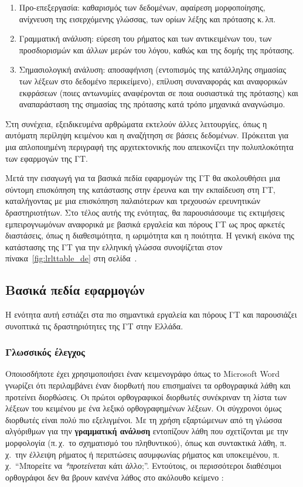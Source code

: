 \documentclass[]{../../metanetpaper}
\begin{document}
\begin{multicols}{2}
\begin{enumerate}
\item Προ-επεξεργασία: καθαρισμός των δεδομένων, αφαίρεση μορφοποίησης, ανίχνευση της εισερχόμενης γλώσσας, των ορίων λέξης και πρότασης κ.\,λπ.
\item Γραμματική ανάλυση: εύρεση του ρήματος και των αντικειμένων του, των προσδιορισμών και άλλων μερών του λόγου,  καθώς και της δομής της πρότασης.
\item Σημασιολογική ανάλυση: αποσαφήνιση (εντοπισμός της κατάλληλης σημασίας των λέξεων στο δεδομένο περικείμενο), επίλυση συναναφοράς και αναφορικών εκφράσεων (ποιες αντωνυμίες αναφέρονται σε ποια ουσιαστικά της πρότασης) και αναπαράσταση της σημασίας της πρότασης κατά τρόπο μηχανικά αναγνώσιμο.
\end{enumerate}

Στη συνέχεια, εξειδικευμένα αρθρώματα εκτελούν άλλες λειτουργίες, όπως η αυτόματη περίληψη κειμένου και η αναζήτηση σε βάσεις δεδομένων. Πρόκειται για μια απλοποιημένη περιγραφή της αρχιτεκτονικής που απεικονίζει την πολυπλοκότητα των εφαρμογών της ΓΤ. 

Μετά την εισαγωγή για τα βασικά πεδία εφαρμογών της ΓΤ θα ακολουθήσει μια σύντομη επισκόπηση της κατάστασης στην έρευνα και την εκπαίδευση στη ΓΤ, καταλήγοντας με μια επισκόπηση παλαιότερων και τρεχουσών ερευνητικών δραστηριοτήτων. Στο τέλος αυτής της ενότητας, θα παρουσιάσουμε τις εκτιμήσεις εμπειρογνωμόνων αναφορικά με βασικά εργαλεία και πόρους ΓΤ ως προς αρκετές διαστάσεις, όπως η διαθεσιμότητα, η ωριμότητα και η ποιότητα. Η γενική εικόνα της κατάστασης της ΓΤ για την ελληνική γλώσσα συνοψίζεται στον πίνακα~\ref{fig:lrlttable_de} στη σελίδα~\pageref{fig:lrlttable_de}.

\subsection{Βασικά πεδία εφαρμογών} 

Η ενότητα αυτή εστιάζει στα πιο σημαντικά εργαλεία και πόρους ΓΤ και παρουσιάζει συνοπτικά τις δραστηριότητες της ΓΤ στην Ελλάδα. 

\subsubsection{Γλωσσικός έλεγχος}

Οποιοσδήποτε έχει χρησιμοποιήσει έναν κειμενογράφο όπως το Microsoft Word γνωρίζει ότι περιλαμβάνει έναν διορθωτή που επισημαίνει τα ορθογραφικά λάθη και προτείνει διορθώσεις. Οι πρώτοι ορθογραφικοί διορθωτές συνέκριναν τη λίστα των λέξεων του κειμένου με ένα λεξικό ορθογραφημένων λέξεων. Οι σύγχρονοι όμως διορθωτές είναι πολύ πιο εξελιγμένοι.  Με τη χρήση εξαρτώμενων από τη γλώσσα αλγόριθμων για την \textbf{γραμματική ανάλυση} εντοπίζουν λάθη που σχετίζονται με την μορφολογία (π.\,χ.~το σχηματισμό του πληθυντικού), όπως και συντακτικά λάθη, π.\,χ.~την έλλειψη ρήματος ή περιπτώσεις ασυμφωνίας ρήματος και υποκειμένου, π.\,χ.~“Μπορείτε να \textit{*προτείνεται} κάτι άλλο;”. Εντούτοις, οι περισσότεροι διαθέσιμοι ορθογράφοι δεν θα βρουν κανένα λάθος στο ακόλουθο κείμενο \cite{zar1}:


\end{multicols}
\end{document}

